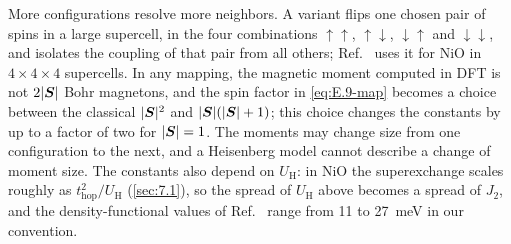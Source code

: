 More configurations resolve more neighbors. A variant flips one chosen pair of spins in a large supercell, in the four combinations $\uparrow\uparrow$, $\uparrow\downarrow$, $\downarrow\uparrow$ and $\downarrow\downarrow$, and isolates the coupling of that pair from all others; Ref.~\cite[Sect.~II]{dossantos2026comparative} uses it for NiO in $4\times4\times4$ supercells. In any mapping, the magnetic moment computed in DFT is not $2|\bm{S}|$ Bohr magnetons, and the spin factor in \cref{eq:E.9-map} becomes a choice between the classical $|\bm{S}|^2$ and $|\bm{S}|(|\bm{S}| + 1)$; this choice changes the constants by up to a factor of two for $|\bm{S}| = 1$. The moments may change size from one configuration to the next, and a Heisenberg model cannot describe a change of moment size. The constants also depend on $U_{\mathrm{H}}$: in NiO the superexchange scales roughly as $t_{\mathrm{hop}}^2/U_{\mathrm{H}}$ (\cref{sec:7.1}), so the spread of $U_{\mathrm{H}}$ above becomes a spread of $J_2$, and the density-functional values of Ref.~\cite[Table~III]{fischer2009exchange} range from 11 to \SI{27}{meV} in our convention.

